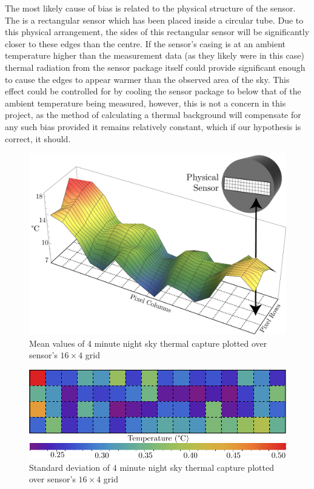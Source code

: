 \documentclass[../thesis/thesis.tex]{subfiles}
\begin{document}
The most likely cause of bias is related to the physical structure of the sensor. The \mlx is a rectangular sensor which has been placed inside a circular tube. Due to this physical arrangement, the sides of this rectangular sensor will be significantly closer to these edges than the centre. If the sensor's casing is at an ambient temperature higher than the measurement data (as they likely were in this case) thermal radiation from the sensor package itself could provide significant enough to cause the edges to appear warmer than the observed area of the sky. This effect could be controlled for by cooling the sensor package to below that of the ambient temperature being measured, however, this is not a concern in this project, as the method of calculating a thermal background will compensate for any such bias provided it remains relatively constant, which if our hypothesis is correct, it should.

\begin{figure}
\centering
\includegraphics[width=\textwidth]{../diagrams/rest-avg-embed.pdf}
\caption{Mean values of 4 minute night sky thermal capture plotted over sensor's $16\times4$ grid}
\label{fig:meanplot}
\end{figure}

\begin{figure}
\centering
\includegraphics[width=\textwidth]{../diagrams/stddev-contour2.pdf}
\caption{Standard deviation of 4 minute night sky thermal capture plotted over sensor's $16\times4$ grid}
\label{fig:stdplot}
\end{figure}
\end{document}
